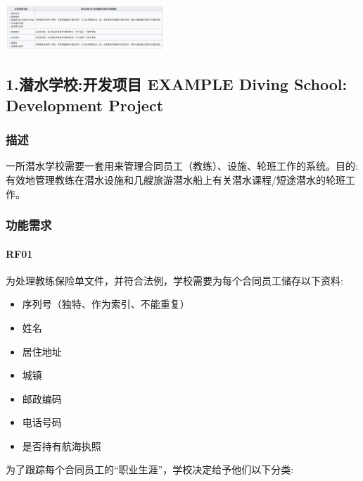 \includegraphics[width=6cm]{Screenshotfrom2023-11-1302-05-21.png}

\hypertarget{ux6f5cux6c34ux5b66ux6821ux5f00ux53d1ux9879ux76ee-example-diving-school-development-project}{%
\subsection{1.潜水学校:开发项目 EXAMPLE Diving School: Development
Project}\label{ux6f5cux6c34ux5b66ux6821ux5f00ux53d1ux9879ux76ee-example-diving-school-development-project}}

\hypertarget{ux63cfux8ff0}{%
\subsubsection{描述}\label{ux63cfux8ff0}}

一所潜水学校需要一套用来管理合同员工（教练）、设施、轮班工作的系统。目的:有效地管理教练在潜水设施和几艘旅游潜水船上有关潜水课程/短途潜水的轮班工作。

\hypertarget{ux529fux80fdux9700ux6c42}{%
\subsubsection{功能需求}\label{ux529fux80fdux9700ux6c42}}

\hypertarget{rf01}{%
\paragraph{RF01}\label{rf01}}

为处理教练保险单文件，并符合法例，学校需要为每个合同员工储存以下资料:

\begin{itemize}
\tightlist
\item
  序列号（独特、作为索引、不能重复）
\item
  姓名
\item
  居住地址
\item
  城镇
\item
  邮政编码
\item
  电话号码
\item
  是否持有航海执照
\end{itemize}

为了跟踪每个合同员工的``职业生涯''，学校决定给予他们以下分类:

